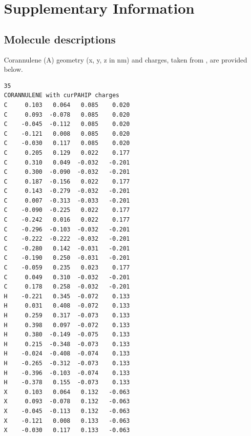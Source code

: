 
\renewcommand{\thefigure}{A\arabic{figure}}
\setcounter{figure}{0}
\renewcommand{\thetable}{A\arabic{table}}
\setcounter{table}{0}

\section{Supplementary Information}
\label{supplinfo}
\subsection{Molecule descriptions}
\label{sec:SImoleculedesc}
Corannulene (A) geometry (x, y, z in nm) and charges, taken from \citet{bowal2019ion}, are provided below.
%
\begin{verbatim}
35 
CORANNULENE with curPAHIP charges
C     0.103   0.064   0.085    0.020  
C     0.093  -0.078   0.085    0.020  
C    -0.045  -0.112   0.085    0.020  
C    -0.121   0.008   0.085    0.020  
C    -0.030   0.117   0.085    0.020  
C     0.205   0.129   0.022    0.177  
C     0.310   0.049  -0.032   -0.201 
C     0.300  -0.090  -0.032   -0.201 
C     0.187  -0.156   0.022    0.177  
C     0.143  -0.279  -0.032   -0.201 
C     0.007  -0.313  -0.033   -0.201 
C    -0.090  -0.225   0.022    0.177  
C    -0.242   0.016   0.022    0.177  
C    -0.296  -0.103  -0.032   -0.201 
C    -0.222  -0.222  -0.032   -0.201 
C    -0.280   0.142  -0.031   -0.201 
C    -0.190   0.250  -0.031   -0.201 
C    -0.059   0.235   0.023    0.177  
C     0.049   0.310  -0.032   -0.201 
C     0.178   0.258  -0.032   -0.201 
H    -0.221   0.345  -0.072    0.133  
H     0.031   0.408  -0.072    0.133  
H     0.259   0.317  -0.073    0.133  
H     0.398   0.097  -0.072    0.133  
H     0.380  -0.149  -0.075    0.133  
H     0.215  -0.348  -0.073    0.133  
H    -0.024  -0.408  -0.074    0.133  
H    -0.265  -0.312  -0.073    0.133  
H    -0.396  -0.103  -0.074    0.133  
H    -0.378   0.155  -0.073    0.133  
X     0.103   0.064   0.132   -0.063 
X     0.093  -0.078   0.132   -0.063 
X    -0.045  -0.113   0.132   -0.063 
X    -0.121   0.008   0.133   -0.063 
X    -0.030   0.117   0.133   -0.063
\end{verbatim}


